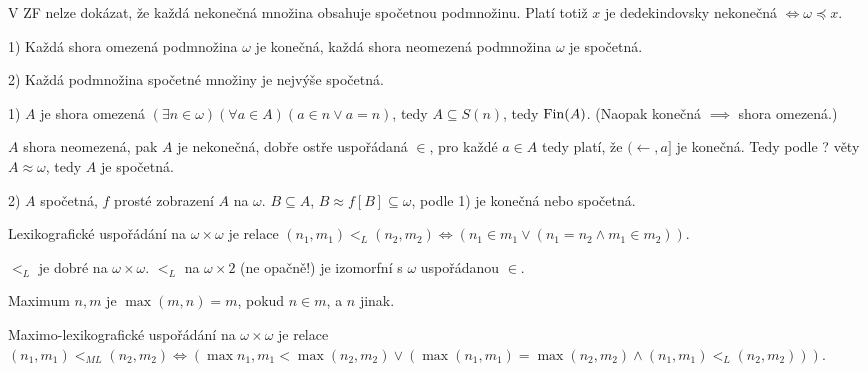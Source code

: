 \documentclass[12pt]{article}                   %
\begin{document}
    \begin{poznamka}
        V ZF nelze dokázat, že každá nekonečná množina obsahuje spočetnou podmnožinu. Platí totiž $x$ je dedekindovsky nekonečná $\Leftrightarrow \omega \preceq x$.
    \end{poznamka}

    \begin{veta}
        1) Každá shora omezená podmnožina $\omega$ je konečná, každá shora neomezená podmnožina $\omega$ je spočetná.

        2) Každá podmnožina spočetné množiny je nejvýše spočetná.

        \begin{dukazin}
            1) $A$ je shora omezená $(\exists n \in \omega)(\forall a \in A)(a \in n \lor a = n)$, tedy $A \subseteq S(n)$, tedy $\operatorname{Fin}(A)$. (Naopak konečná $\implies$ shora omezená.)

            $A$ shora neomezená, pak $A$ je nekonečná, dobře ostře uspořádaná $\in$, pro každé $a \in A$ tedy platí, že $(\leftarrow, a]$ je konečná. Tedy podle ? věty $A \approx \omega$, tedy $A$ je spočetná.

            2) $A$ spočetná, $f$ prosté zobrazení $A$ na $\omega$. $B \subseteq A$, $B \approx f[B] \subseteq \omega$, podle 1) je konečná nebo spočetná.
        \end{dukazin}
    \end{veta}


    \begin{definice}
        Lexikografické uspořádání na $\omega \times \omega$ je relace $(n_1, m_1) <_L (n_2, m_2) \Leftrightarrow (n_1 \in m_1 \lor (n_1=n_2 \land m_1 \in m_2))$.
    \end{definice}

    \begin{dusledek}
        $<_L$ je dobré na $\omega\times \omega$. $<_L$ na $\omega \times 2$ (ne opačně!) je izomorfní s $\omega$ uspořádanou $\in$.
    \end{dusledek}

    \begin{definice}[Maximum]
        Maximum $n, m$ je $\max(m, n) = m$, pokud $n \in m$, a $n$ jinak.
    \end{definice}

    \begin{definice}
        Maximo-lexikografické uspořádání na $\omega \times \omega$ je relace $(n_1, m_1) <_{ML} (n_2, m_2) \Leftrightarrow (\max{n_1, m_1} < \max(n_2, m_2) \lor (\max(n_1, m_1) = \max(n_2, m_2) \land (n_1, m_1) <_L (n_2, m_2)))$.
    \end{definice}
\end{document}
